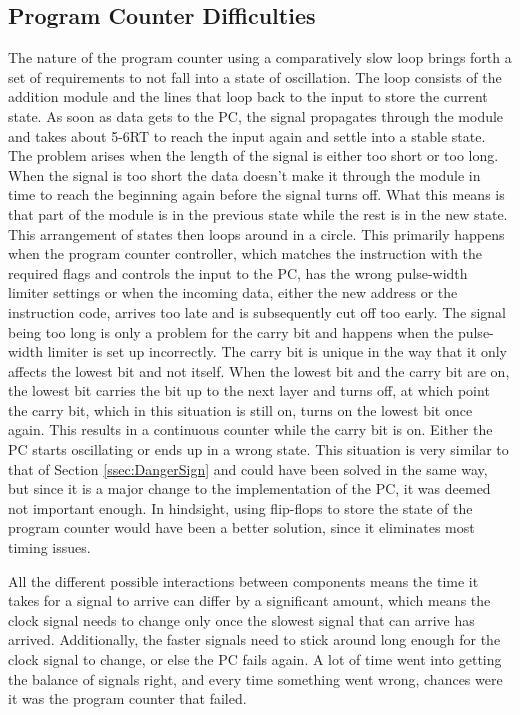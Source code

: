 \subsection{Program Counter Difficulties}
The nature of the program counter using a comparatively slow loop brings forth a set of requirements to not fall into a state of oscillation. The loop consists of the addition module and the lines that loop back to the input to store the current state. As soon as data gets to the PC, the signal propagates through the module and takes about 5-6RT to reach the input again and settle into a stable state. The problem arises when the length of the signal is either too short or too long. When the signal is too short the data doesn't make it through the module in time to reach the beginning again before the signal turns off. What this means is that part of the module is in the previous state while the rest is in the new state. This arrangement of states then loops around in a circle. This primarily happens when the program counter controller, which matches the instruction with the required flags and controls the input to the PC, has the wrong pulse-width limiter settings or when the incoming data, either the new address or the instruction code, arrives too late and is subsequently cut off too early. The signal being too long is only a problem for the carry bit and happens when the pulse-width limiter is set up incorrectly. The carry bit is unique in the way that it only affects the lowest bit and not itself. When the lowest bit and the carry bit are on, the lowest bit carries the bit up to the next layer and turns off, at which point the carry bit, which in this situation is still on, turns on the lowest bit once again. This results in a continuous counter while the carry bit is on. Either the PC starts oscillating or ends up in a wrong state. This situation is very similar to that of Section \ref{ssec:DangerSign} and could have been solved in the same way, but since it is a major change to the implementation of the PC, it was deemed not important enough. In hindsight, using flip-flops to store the state of the program counter would have been a better solution, since it eliminates most timing issues.

All the different possible interactions between components means the time it takes for a signal to arrive can differ by a significant amount, which means the clock signal needs to change only once the slowest signal that can arrive has arrived. Additionally, the faster signals need to stick around long enough for the clock signal to change, or else the PC fails again. A lot of time went into getting the balance of signals right, and every time something went wrong, chances were it was the program counter that failed.

